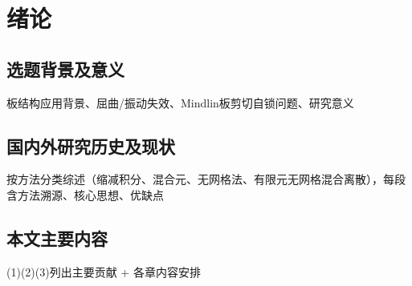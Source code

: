 

\chapter{绪论}

\section{选题背景及意义}

板结构应用背景、屈曲/振动失效、Mindlin板剪切自锁问题、研究意义

\section{国内外研究历史及现状}

按方法分类综述（缩减积分、混合元、无网格法、有限元无网格混合离散），每段含方法溯源、核心思想、优缺点

\section{本文主要内容}

(1)(2)(3)列出主要贡献 + 各章内容安排
